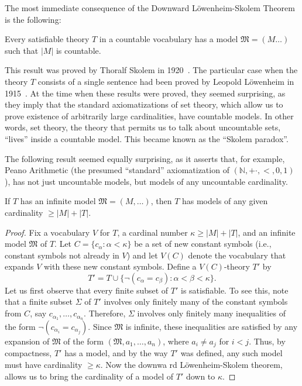 \documentclass{scrartcl}
\newcommand{\FM}{\mathfrak{M}}
\begin{document}
The most immediate consequence of the Downward Löwenheim-Skolem Theorem is the following:

\begin{theorem}
Every satisfiable theory $T$ in a countable vocabulary  has a model $\FM=(M\dots)$ such that $|M|$ is countable.
\end{theorem}

\begin{history}
This result was proved by Thoralf Skolem in 1920~\cite{Skolem:1970}. The particular case when the theory $T$ consists of a single sentence had been proved by Leopold Löwenheim in 1915~\cite{Loewenheim:1915}. At the time when these results were proved, they seemed surprising, as they imply that the standard axiomatizations of set theory, which allow us to prove existence of arbitrarily large cardinalities, have countable models. In other words, set theory, the theory that permits us to talk about uncountable sets, ``lives'' inside a countable model. This became known as the ``Skolem paradox''. 

The following result seemed equally surprising, as it asserts that, for example, Peano Arithmetic (the presumed ``standard'' axiomatization of $(\mathbb{N}, + \cdot, <, 0, 1)$), has not just uncountable models, but models of any uncountable cardinality.
\end{history}

\begin{corollary}
\label{T:Upward L-S}
If $T$ has an infinite model $\FM=(M,\dots)$, then $T$ has models of any given cardinality $\ge |M|+|T|$.
\end{corollary}

\begin{proof}
Fix a vocabulary $V$ for $T$, a cardinal number $\kappa\ge |M|+|T|$, and an infinite model $\FM$ of $T$. Let $C=\{c_\alpha \colon \alpha<\kappa\}$ be a set of new constant symbols (i.e., constant symbols not already in $V$) and let $V(C)$ denote the vocabulary that expands $V$ with these new constant symbols. Define a $V(C)$-theory $T'$ by
\[
T'= T\cup\{\neg(c_\alpha =c_\beta)\colon \alpha<\beta<\kappa\}.
\]
Let us first observe that every finite subset of $T'$ is satisfiable. To see this, note that a finite subset $\Sigma$ of $T'$ involves only finitely many of the constant symbols from $C$, say $c_{\alpha_1},\dots,c_{\alpha_n}$. Therefore, $\Sigma$ involves only finitely many inequalities of the form $\neg(c_{\alpha_i} =c_{\alpha_j})$. Since $\FM$ is infinite, these inequalities are satisfied by any expansion of $\FM$ of the form 
$(\FM, a_1,\dots, a_n)$, where $a_i\neq a_j$ for $i<j$. Thus, by compactness,  $T'$ has a model, and by the way $T'$ was defined, any such model must have cardinality $\ge \kappa$. Now the downwa rd Löwenheim-Skolem theorem, allows us to bring the cardinality of a model of $T'$ down to $\kappa$.
\end{proof}
\end{document}
